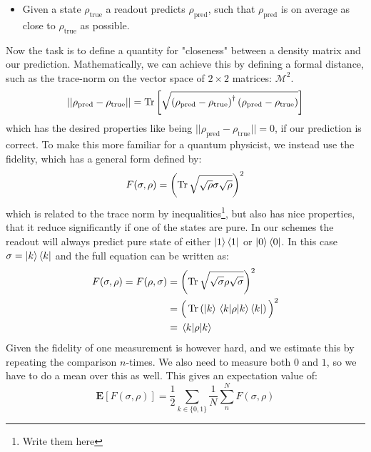 \begin{itemize}
    \item Given a state $\rho_{\text{true}}$ a readout predicts $\rho_{\text{pred}}$, such that $\rho_{\text{pred}}$ is on average as close to $\rho_{\text{true}}$ as possible.
\end{itemize}
Now the task is to define a quantity for "closeness" between a density matrix and our prediction. Mathematically, we can achieve this by defining a formal distance, such as the trace-norm on the vector space of $2\times2$ matrices: $\mathcal{M}^2$. 
\begin{equation}
    ||\rho_{\text{pred}} - \rho_{\text{true}}|| = \Tr \left[\sqrt{\left(\rho_{\text{pred}} - \rho_{\text{true}} \right)^\dagger \left(\rho_{\text{pred}} - \rho_{\text{true}} \right)} \right]
\end{equation}
which has the desired properties like being $||\rho_{\text{pred}} - \rho_{\text{true}}|| = 0$, if our prediction is correct. To make this more familiar for a quantum physicist, we instead use the fidelity, which has a general form defined by:
\begin{equation}
    F(\sigma, \rho) = \left(\Tr\sqrt{\sqrt{\rho} \sigma \sqrt{\rho}}\right)^2
\end{equation}
which is related to the trace norm by inequalities\footnote{Write them here}, but also has nice properties, that it reduce significantly if one of the states are pure. In our schemes the readout will always predict pure state of either $\ket{1}\bra{1}$ or $\ket{0}\bra{0}$. In this case $\sigma = \ket{k}\bra{k}$ and the full equation can be written as:  
\begin{align*}
    F(\sigma, \rho) = F(\rho, \sigma) &= \left(\Tr\sqrt{\sqrt{\sigma} \rho \sqrt{\sigma}}\right)^2 \\
    &= \Big(\Tr \left(\ket{k}\mel{k}{\rho}{k}\bra{k}\right)\Big)^2\\
    &= \mel{k}{\rho}{k}
\end{align*}
Given the fidelity of one measurement is however hard, and we estimate this by repeating the comparison $n$-times. We also need to measure both $0$ and $1$, so we have to do a mean over this as well. This gives an expectation value of:
\begin{equation}
    \mathbf{E}\left[F(\sigma, \rho)\right] = \frac12 \sum_{k \in \{0, 1\}}\frac{1}{N}\sum_n^N F(\sigma, \rho)
\end{equation}
